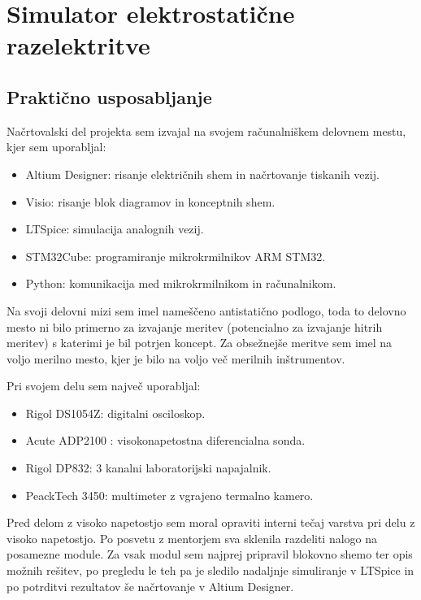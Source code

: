 \documentclass[a4paper,twoside,openright,12pt,Slovene]{book}
\begin{document}
\chapter{Simulator elektrostatične razelektritve} \label{ESDSIM}

	\section{Praktično usposabljanje}
	Načrtovalski del projekta sem izvajal na svojem računalniškem delovnem mestu, kjer sem uporabljal:
	\begin{itemize}
		\item Altium Designer: risanje električnih shem in načrtovanje tiskanih vezij.
		\item Visio: risanje blok diagramov in konceptnih shem.
		\item LTSpice: simulacija analognih vezij.
		\item STM32Cube: programiranje mikrokrmilnikov ARM STM32.
		\item Python: komunikacija med mikrokrmilnikom in računalnikom.
	\end{itemize}
	Na svoji delovni mizi sem imel nameščeno antistatično podlogo, toda to delovno mesto ni bilo primerno za izvajanje meritev (potencialno za izvajanje hitrih meritev) s katerimi je bil potrjen koncept.
	Za obsežnejše meritve sem imel na voljo merilno mesto, kjer je bilo na voljo več merilnih inštrumentov. 
	
	Pri svojem delu sem največ uporabljal:
	\begin{itemize}
		\item Rigol DS1054Z: digitalni osciloskop.
		\item Acute ADP2100 : visokonapetostna diferencialna sonda.
		\item Rigol DP832: 3 kanalni laboratorijski napajalnik.
		\item PeackTech 3450: multimeter z vgrajeno termalno kamero.
	\end{itemize}
	Pred delom z visoko napetostjo sem moral opraviti interni tečaj varstva pri delu z visoko napetostjo. Po posvetu z mentorjem sva sklenila razdeliti nalogo na posamezne module. Za vsak modul sem najprej pripravil blokovno shemo ter opis možnih rešitev, po pregledu le teh pa je sledilo nadaljnje simuliranje v LTSpice in po potrditvi rezultatov še načrtovanje v Altium Designer.
	
\end{document}
